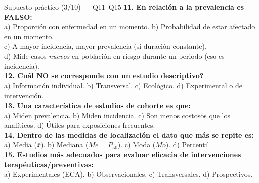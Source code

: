 \documentclass[aspectratio=169,8pt]{beamer}
\begin{document}
\begin{frame}{Supuesto pr\'actico (3/10) --- Q11--Q15}
  \scriptsize
  \textbf{11. En relaci\'on a la prevalencia es FALSO:}\\
  a) Proporci\'on con enfermedad en un momento.\;
  b) Probabilidad de estar afectado en un momento.\\
  c) A mayor incidencia, mayor prevalencia (si duraci\'on constante).\\
  d) Mide casos \emph{nuevos} en poblaci\'on en riesgo durante un periodo (eso es incidencia).\\[3pt]
  \textbf{12. \textquestiondown{}Cu\'al NO se corresponde con un estudio descriptivo?}\\
  a) Informaci\'on individual.\; b) Transversal.\; c) Ecol\'ogico.\; d) Experimental o de intervenci\'on.\\[3pt]
  \textbf{13. Una caracter\'istica de estudios de cohorte es que:}\\
  a) Miden prevalencia.\; b) Miden incidencia.\; c) Son menos costosos que los anal\'iticos.\; d) \'Utiles para exposiciones frecuentes.\\[3pt]
  \textbf{14. Dentro de las medidas de localizaci\'on el dato que m\'as se repite es:}\\
  a) Media ($\bar x$).\; b) Mediana ($Me=P_{50}$).\; c) Moda ($Mo$).\; d) Percentil.\\[3pt]
  \textbf{15. Estudios m\'as adecuados para evaluar eficacia de intervenciones terap\'euticas/preventivas:}\\
  a) Experimentales (ECA).\; b) Observacionales.\; c) Transversales.\; d) Prospectivos.
\end{frame}
\end{document}
